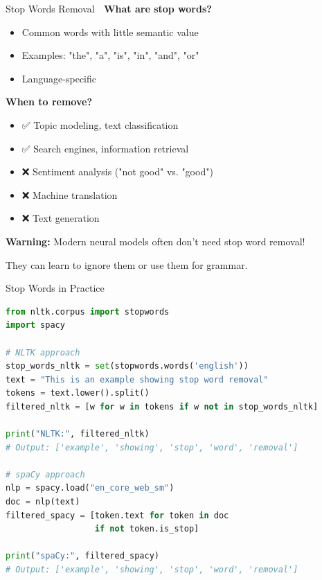 \documentclass[aspectratio=169]{beamer}
\begin{document}
\begin{frame}[shrink=10]{Stop Words Removal 🛑}
    \textbf{What are stop words?}
    \begin{itemize}\setlength{\itemsep}{0pt}
        \item Common words with little semantic value
        \item Examples: "the", "a", "is", "in", "and", "or"
        \item Language-specific
    \end{itemize}

    \vspace{0.5em}
    \textbf{When to remove?}
    \begin{itemize}\setlength{\itemsep}{0pt}
        \item ✅ Topic modeling, text classification
        \item ✅ Search engines, information retrieval
        \item ❌ Sentiment analysis ("not good" vs. "good")
        \item ❌ Machine translation
        \item ❌ Text generation
    \end{itemize}

    \vspace{0.5em}
    \textbf{Warning:} Modern neural models often don't need stop word removal!

    They can learn to ignore them or use them for grammar.
\end{frame}

\begin{frame}[fragile]{Stop Words in Practice 💼}
    \begin{lstlisting}[language=Python]
from nltk.corpus import stopwords
import spacy

# NLTK approach
stop_words_nltk = set(stopwords.words('english'))
text = "This is an example showing stop word removal"
tokens = text.lower().split()
filtered_nltk = [w for w in tokens if w not in stop_words_nltk]

print("NLTK:", filtered_nltk)
# Output: ['example', 'showing', 'stop', 'word', 'removal']

# spaCy approach
nlp = spacy.load("en_core_web_sm")
doc = nlp(text)
filtered_spacy = [token.text for token in doc
                  if not token.is_stop]

print("spaCy:", filtered_spacy)
# Output: ['example', 'showing', 'stop', 'word', 'removal']
    \end{lstlisting}
\end{frame}
\end{document}
